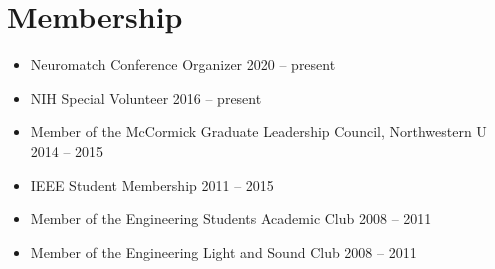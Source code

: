 \section{\sc Membership}

\begin{itemize}[leftmargin=0cm, label={}]

\item Neuromatch Conference Organizer \hfill 2020 -- present
\item NIH Special Volunteer \hfill 2016 -- present
\item Member of the McCormick Graduate Leadership Council, Northwestern U	\hfill 2014 -- 2015
\item IEEE Student Membership \hfill 2011 -- 2015
\item Member of the Engineering Students Academic Club \hfill 2008 -- 2011
\item Member of the Engineering Light and Sound Club \hfill 2008 -- 2011

\end{itemize}